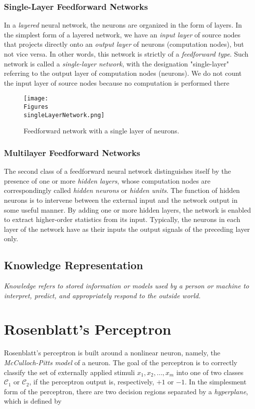 \documentclass[twocolumn]{article}
\begin{document}
	 \subsubsection{Single-Layer Feedforward Networks}
		 In a \textit{layered} neural network, the neurons are organized in the form of layers. In the simplest form of a layered network, we have an \textit{input layer} of source nodes that projects directly onto an \textit{output layer} of neurons (computation nodes), but not vice versa. In other words, this network is strictly of a \textit{feedforward type}. Such network is called a \textit{single-layer network}, with the designation "single-layer" referring to the output layer of computation nodes (neurons). We do not count the input layer of source nodes because no computation is performed there

		 \begin{figure}
			 \center
			 \texttt{[image: \\Figures\\singleLayerNetwork.png]}
			 \caption{Feedforward network with a single layer of neurons.}
			 \label{singleLayerNetwork}
		 \end{figure}

	 \subsubsection{Multilayer Feedforward Networks}
		 The second class of a feedforward neural network distinguishes itself by the presence of one or more \textit{hidden layers}, whose computation nodes are correspondingly called \textit{hidden neurons} or \textit{hidden units}. The function of hidden neurons is to intervene between the external input and the network output in some useful manner. By adding one or more hidden layers, the network is enabled to extract higher-order statistics from its input. Typically, the neurons in each layer of the network have as their inputs the output signals of the preceding layer only.

 \subsection{Knowledge Representation}
	 \textit{Knowledge refers to stored information or models used by a person or machine to interpret, predict, and appropriately respond to the outside world.}

\section{Rosenblatt's Perceptron}
 Rosenblatt's perceptron is built around a nonlinear neuron, namely, the \textit{McCulloch-Pitts model} of a neuron. The goal of the perceptron is to correctly classify the set of externally applied stimuli $ x_1, x_2, \ldots, x_m $ into one of two classes $ \mathcal{C}_{1} $ or $ \mathcal{C}_{2} $, if the perceptron output is, respectively, $ +1 $ or $ -1 $. In the simplesment form of the perceptron, there are two decision regions separated by a \textit{hyperplane}, which is defined by
\end{document}
